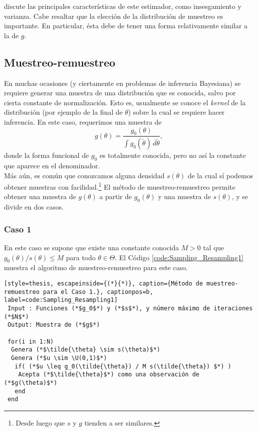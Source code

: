 \citet[Capítulo~4.2]{notas_bayes_egp} discute las principales características de este estimador, como insesgamiento y varianza. Cabe resaltar que la elección de la distribución de muestreo es importante. En particular, ésta debe de tener una forma relativamente similar a la de $g$.




\subsection{Muestreo-remuestreo}


En muchas ocasiones (y ciertamente en problemas de inferencia Bayesiana) se requiere generar una muestra de una distribución que es conocida, salvo por cierta constante de normalización. Esto es, usualmente se conoce el \textit{kernel} de la distribución (por ejemplo de la final de $\theta$) sobre la cual se requiere hacer inferencia. En este caso, requerimos una muestra de
\begin{equation*}
	g(\theta) = \frac{ g_0(\theta) }{ \int g_0(\tilde{\theta}) \, d\tilde{\theta} },
\end{equation*}
donde la forma funcional de $g_0$ es totalmente conocida, pero no así la constante que aparece en el denominador. \\

Más aún, es común que conozcamos alguna densidad $s(\theta)$ de la cual sí podemos obtener muestras con facilidad.\footnote{Desde luego que $s$ y $g$ tienden a ser similares.} El método de muestreo-remuestreo permite obtener una muestra de $g(\theta)$ a partir de $g_0(\theta)$ y una muestra de $s(\theta)$, y se divide en dos casos.


\subsubsection*{Caso 1}


En este caso se supone que existe una constante conocida $M > 0$ tal que $g_0(\theta) / s(\theta) \leq M$ para todo $\theta \in \Theta$. El Código \ref{code:Sampling_Resampling1} muestra el algoritmo de muestreo-remuestreo para este caso.

\begin{lstlisting}[style=thesis, escapeinside={(*}{*)}, caption={Método de muestreo-remuestreo para el Caso 1.}, captionpos=b, label=code:Sampling_Resampling1]
 Input : Funciones (*$g_0$*) y (*$s$*), y número máximo de iteraciones (*$N$*)
 Output: Muestra de (*$g$*)
 
 for(i in 1:N)
  Genera (*$\tilde{\theta} \sim s(\theta)$*)
  Genera (*$u \sim \U(0,1)$*)
   if( (*$u \leq g_0(\tilde{\theta}) / M s(\tilde{\theta}) $*) )
    Acepta (*$\tilde{\theta}$*) como una observación de (*$g(\theta)$*)
   end
 end
\end{lstlisting}


